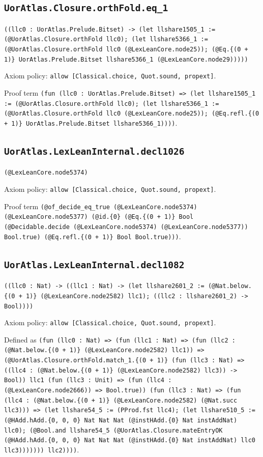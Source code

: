 \documentclass[11pt]{article}
\begin{document}
\subsection*{\texttt{UorAtlas.Closure.orthFold.eq\_1}}
\noindent\texttt{((llc0 : UorAtlas.Prelude.Bitset) -> (let llshare1505\_1 := (@UorAtlas.Closure.orthFold llc0); (let llshare5366\_1 := (@UorAtlas.Closure.orthFold llc0 (@LexLeanCore.node25)); (@Eq.\{(0 + 1)\} UorAtlas.Prelude.Bitset llshare5366\_1 (@LexLeanCore.node29)))))}\par
\noindent Axiom policy: \texttt{allow [Classical.choice, Quot.sound, propext]}.\par
\noindent Proof term \texttt{(fun (llc0 : UorAtlas.Prelude.Bitset) => (let llshare1505\_1 := (@UorAtlas.Closure.orthFold llc0); (let llshare5366\_1 := (@UorAtlas.Closure.orthFold llc0 (@LexLeanCore.node25)); (@Eq.refl.\{(0 + 1)\} UorAtlas.Prelude.Bitset llshare5366\_1))))}.\par
\subsection*{\texttt{UorAtlas.LexLeanInternal.decl1026}}
\noindent\texttt{(@LexLeanCore.node5374)}\par
\noindent Axiom policy: \texttt{allow [Classical.choice, Quot.sound, propext]}.\par
\noindent Proof term \texttt{(@of\_decide\_eq\_true (@LexLeanCore.node5374) (@LexLeanCore.node5377) (@id.\{0\} (@Eq.\{(0 + 1)\} Bool (@Decidable.decide (@LexLeanCore.node5374) (@LexLeanCore.node5377)) Bool.true) (@Eq.refl.\{(0 + 1)\} Bool Bool.true)))}.\par
\subsection*{\texttt{UorAtlas.LexLeanInternal.decl1082}}
\noindent\texttt{((llc0 : Nat) -> ((llc1 : Nat) -> (let llshare2601\_2 := (@Nat.below.\{(0 + 1)\} (@LexLeanCore.node2582) llc1); ((llc2 : llshare2601\_2) -> Bool))))}\par
\noindent Axiom policy: \texttt{allow [Classical.choice, Quot.sound, propext]}.\par
\noindent Defined as \texttt{(fun (llc0 : Nat) => (fun (llc1 : Nat) => (fun (llc2 : (@Nat.below.\{(0 + 1)\} (@LexLeanCore.node2582) llc1)) => (@UorAtlas.Closure.orthFold.match\_1.\{(0 + 1)\} (fun (llc3 : Nat) => ((llc4 : (@Nat.below.\{(0 + 1)\} (@LexLeanCore.node2582) llc3)) -> Bool)) llc1 (fun (llc3 : Unit) => (fun (llc4 : (@LexLeanCore.node2666)) => Bool.true)) (fun (llc3 : Nat) => (fun (llc4 : (@Nat.below.\{(0 + 1)\} (@LexLeanCore.node2582) (@Nat.succ llc3))) => (let llshare54\_5 := (PProd.fst llc4); (let llshare510\_5 := (@HAdd.hAdd.\{0, 0, 0\} Nat Nat Nat (@instHAdd.\{0\} Nat instAddNat) llc0); (@Bool.and llshare54\_5 (@UorAtlas.Closure.mateEntryOK (@HAdd.hAdd.\{0, 0, 0\} Nat Nat Nat (@instHAdd.\{0\} Nat instAddNat) llc0 llc3))))))) llc2))))}.\par
\end{document}
